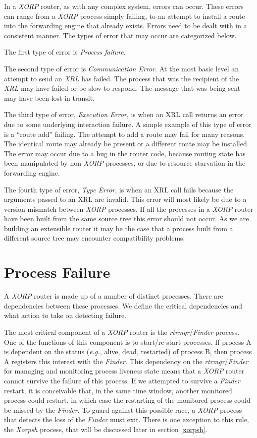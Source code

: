 \documentclass[11pt]{article}
\makeatletter
\newcommand{\eg}{\emph{e.g.,}\xspace}
\newcommand{\xorp} {{\em XORP}\@\xspace}
\newcommand{\finder} {{\em Finder}\@\xspace}
\newcommand{\xorpsh} {{\em Xorpsh}\@\xspace}
\newcommand{\xrl} {{\em XRL}\@\xspace}
\newcommand{\rtrmgr} {{\em rtrmgr}\@\xspace}
\makeatother
\begin{document}
In a \xorp router, as with any complex system, errors can occur. These
errors can range from a \xorp process simply failing, to an attempt to
install a route into the forwarding engine that already exists. Errors
need to be dealt with in a consistent manner. The types
of error that may occur are categorized below.

The first type of error is {\em Process failure}.

The second type of error is {\em Communication Error}. At the most
basic level an attempt to send an \xrl has failed. The process that
was the recipient of the \xrl may have failed or be slow to respond.
The message that was being sent may have been lost in transit.

The third type of error, {\em Execution Error}, is when an XRL call
returns an error due to some underlying interaction failure. A simple
example of this type of error is a ``route add'' failing. The attempt to
add a route may fail for many reasons. The identical route may already
be present or a different route may be installed. The error may occur
due to a bug in the router code, because routing state has been
manipulated by non \xorp processes, or due to resource starvation in
the forwarding engine.

The fourth type of error, {\em Type Error}, is when an XRL call fails
because the arguments passed to an XRL are invalid. This error will
most likely be due to a version mismatch between \xorp processes. If
all the processes in a \xorp router have been built from the same
source tree this error should not occur. As we are building an
extensible router it may be the case that a process built from a
different source tree may encounter compatibility problems.

\section{\label{pfailure}Process Failure}

A \xorp router is made up of a number of distinct processes. There are
dependencies between these processes. We define the critical
dependencies and what action to take on detecting failure.

The most critical component of a \xorp router is the \rtrmgr/\finder
process. One of the functions of this component is to start/re-start
processes. If process A is dependent on the status (\eg alive, dead,
restarted) of process B, then process A registers this interest with
the \finder. This dependency on the \rtrmgr/\finder for managing and
monitoring process liveness state means that a \xorp router cannot
survive the failure of this process. If we attempted to survive a
\finder restart, it is conceivable that, in the same time window,
another monitored process could restart, in which case the restarting
of the monitored process could be missed by the \finder. To guard
against this possible race, a \xorp process that detects the loss of
the \finder must exit. There is one exception to this rule, the
\xorpsh process, that will be discussed later in section \ref{xorpsh}.
\end{document}

